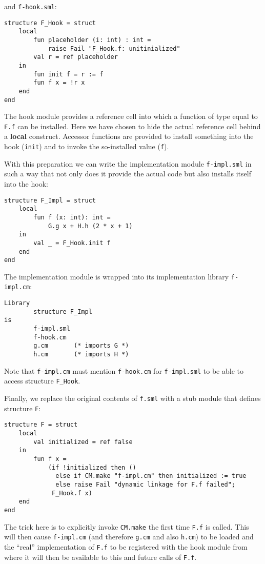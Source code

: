 \documentclass{article}
\begin{document}
and {\tt f-hook.sml}:

\begin{verbatim}
structure F_Hook = struct
    local
        fun placeholder (i: int) : int =
            raise Fail "F_Hook.f: unitinialized"
        val r = ref placeholder
    in
        fun init f = r := f
        fun f x = !r x
    end
end
\end{verbatim}

The hook module provides a reference cell into which a function of
type equal to {\tt F.f} can be installed.  Here we have chosen to hide
the actual reference cell behind a {\bf local} construct.  Accessor
functions are provided to install something into the hook
({\tt init}) and to invoke the so-installed value ({\tt f}).

With this preparation we can write the implementation module {\tt f-impl.sml}
in such a way that not only does it provide the actual
code but also installs itself into the hook:
\begin{verbatim}
structure F_Impl = struct
    local
        fun f (x: int): int =
            G.g x + H.h (2 * x + 1)
    in
        val _ = F_Hook.init f
    end
end
\end{verbatim}
\noindent The implementation module is wrapped into its implementation
library {\tt f-impl.cm}:
\begin{verbatim}
Library
        structure F_Impl
is
        f-impl.sml
        f-hook.cm
        g.cm       (* imports G *)
        h.cm       (* imports H *)
\end{verbatim}
\noindent Note that {\tt f-impl.cm} must mention {\tt f-hook.cm} for
{\tt f-impl.sml} to be able to access structure {\tt F\_Hook}.

Finally, we replace the original contents of {\tt f.sml} with a stub
module that defines structure {\tt F}:
\begin{verbatim}
structure F = struct
    local
        val initialized = ref false
    in
        fun f x =
            (if !initialized then ()
              else if CM.make "f-impl.cm" then initialized := true
              else raise Fail "dynamic linkage for F.f failed";
             F_Hook.f x)
    end
end
\end{verbatim}
\noindent The trick here is to explicitly invoke {\tt CM.make} the
first time {\tt F.f} is called.  This will then cause {\tt f-impl.cm}
(and therefore {\tt g.cm} and also {\tt h.cm}) to be loaded and the
``real'' implementation of {\tt F.f} to be registered with the hook
module from where it will then be available to this and future calls
of {\tt F.f}.
\end{document}
